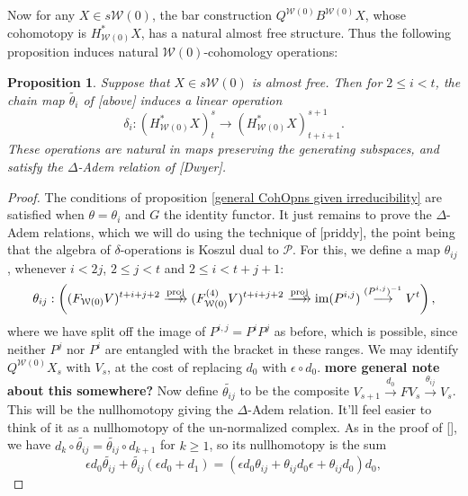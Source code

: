 \documentclass[11pt]{amsart}
\theoremstyle{plain}
\newtheorem{prop}[thm]{Proposition}
\theoremstyle{definition}
\DeclareMathOperator{\im}{im}
\renewcommand{\to}{\longrightarrow}
\newcommand{\calW}{\mathcal{W}}
\newcommand{\calP}{\mathcal{P}}
\theoremstyle{plain}
\newcommand{\Palg}{{\calP}}
\newcommand{\deltaalg}{\Delta} %
\begin{document}
\begin{Cohomology operations for all unstable Lie algebras}
Now for any $X\in s\calW(0)$, the bar construction $Q^{\calW(0)}B^{\calW(0)}X$, whose cohomotopy is $H^*_{\calW(0)}X$, has a natural almost free structure. Thus the following proposition induces natural $\calW(0)$-cohomology operations:
\begin{prop}\label{operations on goerss homology}
Suppose that $X\in s\calW(0)$ is almost free. Then for $2\leq i <t$, the chain map $\widetilde{\theta_i}$ of [above] induces a linear operation
\[\delta_i:(H^*_{\calW(0)}X)^{s}_t\to (H^*_{\calW(0)}X)^{s+1}_{t+i+1}.\] 
These operations are natural in maps preserving the generating subspaces, and satisfy the $\deltaalg$-Adem relation of [Dwyer].
\end{prop}
\begin{proof}
The conditions of proposition \ref{general CohOpns given irreducibility} are satisfied when $\theta=\theta_i$ and $G$ the identity functor. It just remains to prove the $\deltaalg$-Adem relations, which we will do using the technique of [priddy], the point being that the algebra of $\delta$-operations is Koszul dual to $\Palg$. For this, we define a map $\theta_{ij}$, whenever $i<2j$, $2\leq j<t$ and $2\leq i<t+j+1$:
\[\theta_{ij}:\left((F_{\calW(0)}V)^{t+i+j+2}\overset{\textup{proj}}{\makebox[.06ex][l]{$\to$}\to} (F_{\calW(0)}^{(4)}V)^{t+i+j+2}\overset{\textup{proj}}{\makebox[.06ex][l]{$\to$}\to} \im (P^{i,j})\overset{(P^{i,j})^{-1}}{\to}V^{t}\right),\]
where we have split off the image of 
$P^{i,j}=P^iP^j$ %
as before, which is possible, since neither $P^j$ nor $P^i$ are entangled with the bracket in these ranges. We may identify $Q^{\calW(0)}X_s$ with $V_s$, at the cost of replacing $d_0$ with $\epsilon\circ d_0$. \textbf{more general note about this somewhere?} Now define $\widetilde{\theta_{ij}}$ to be the composite $V_{s+1}\overset{d_0}{\to}FV_s\overset{\theta_{ij}}{\to}V_s$. This will be the nullhomotopy giving the $\deltaalg$-Adem relation. It'll feel easier to think of it as a nullhomotopy of the un-normalized complex. As in the proof of [], we have $d_k\circ\widetilde{\theta_{ij}}=\widetilde{\theta_{ij}}\circ d_{k+1}$ for $k\geq1$, so its nullhomotopy is the sum \[\epsilon d_0\widetilde{\theta_{ij}}+\widetilde{\theta_{ij}}(\epsilon d_0+d_1)=(\epsilon d_0\theta_{ij}+\theta_{ij}d_0\epsilon+\theta_{ij}d_0)d_0,\]

\end{proof}
\end{Cohomology operations for all unstable Lie algebras}
\end{document}

